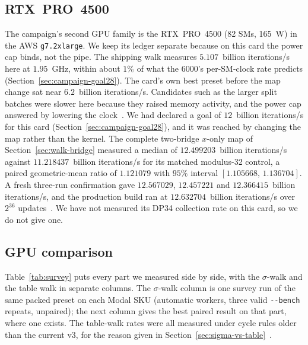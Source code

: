 \subsection{RTX~PRO~4500}
\label{sec:g7}

The campaign's second GPU family is the RTX~PRO~4500 (82 SMs, 165~W)
in the AWS \texttt{g7.2xlarge}. We keep its ledger separate because on
this card the power cap binds, not the pipe. The shipping walk
measures $5.107$~billion iterations/s here at $1.95$~GHz, within about $1\%$ of what the
6000's per-SM-clock rate predicts (Section~\ref{sec:campaign-goal28}).
The card's own best preset before the map change sat near $6.2$~billion iterations/s.
Candidates such as the larger split batches were slower here because
they raised memory activity, and the power cap answered by lowering
the clock~.
We had declared a goal of $12$~billion iterations/s for this card
(Section~\ref{sec:campaign-goal28}), and it was reached by changing the
map rather than the kernel. The complete two-bridge $x$-only map of
Section~\ref{sec:walk-bridge} measured a median of $12.499203$~billion iterations/s
against $11.218437$~billion iterations/s for its matched modulus-32 control, a paired
geometric-mean ratio of $1.121079$ with $95\%$ interval
$[1.105668,\,1.136704]$. A fresh three-run confirmation gave
$12.567029$, $12.457221$ and $12.366415$~billion iterations/s, and the production build
ran at $12.632704$~billion iterations/s over $2^{36}$ updates~.
We have not measured its DP34 collection rate on this card, so we do
not give one.

\subsection{GPU comparison}
\label{sec:survey}

Table~\ref{tab:survey} puts every part we measured side by side, with
the $\sigma$-walk and the table walk in separate columns. The
$\sigma$-walk column is one survey run of the same packed preset on
each Modal SKU (automatic workers, three valid \texttt{-{}-bench}
repeats, unpaired); the next column gives the best paired result on
that part, where one exists. The table-walk rates were all measured
under cycle rules older than the current v3, for the reason given in
Section~\ref{sec:sigma-vs-table}~.

